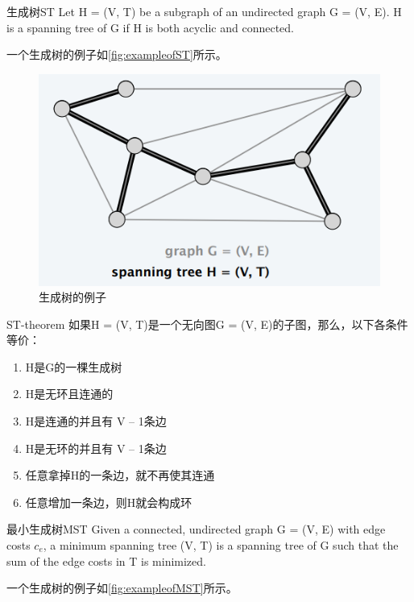 \begin{definition}{生成树}{ST}
Let H = (V, T) be a subgraph of an undirected graph G = (V, E).
H is a spanning tree of G if H is both acyclic and connected.
\end{definition}

一个生成树的例子如\autoref{fig:exampleofST}所示。

\begin{figure}[hbt]
	\centering
	\includegraphics[scale=0.5]{image/exampleofST.png}
	\caption{生成树的例子}\label{fig:exampleofST}
\end{figure}

\begin{theorem}{}{ST-theorem}
	如果H = (V, T)是一个无向图G = (V, E)的子图，那么，以下各条件等价：
	\begin{enumerate}
		\item H是G的一棵生成树
		\item H是无环且连通的
		\item H是连通的并且有 V – 1条边
		\item H是无环的并且有 V – 1条边
		\item 任意拿掉H的一条边，就不再使其连通
		\item 任意增加一条边，则H就会构成环
	\end{enumerate}

\end{theorem}

\begin{definition}{最小生成树}{MST}
	Given a connected, undirected graph G = (V, E) with edge costs $c_e$,
a minimum spanning tree (V, T) is a spanning tree of G such that the sum
of the edge costs in T is minimized.
\end{definition}

一个生成树的例子如\autoref{fig:exampleofMST}所示。

